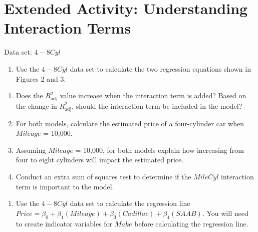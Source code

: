 \documentclass[
]{report}
\providecommand{\tightlist}{%
  \setlength{\itemsep}{0pt}\setlength{\parskip}{0pt}}
\begin{document}
\vspace*{2cm}

\section*{Extended Activity: Understanding Interaction Terms}\label{extended-activity-understanding-interaction-terms}

Data set: \(4-8Cyl\)

\begin{enumerate}
\def\labelenumi{\arabic{enumi}.}
\setcounter{enumi}{34}
\tightlist
\item
  Use the \(4-8Cyl\) data set to calculate the two regression equations shown in Figures 2 and 3.
\end{enumerate}

\begin{enumerate}
\def\labelenumi{\alph{enumi}.}
\tightlist
\item
  Does the \(R^2_{\text{adj}}\) value increase when the interaction term is added? Based on the change in \(R^2_{\text{adj}}\), should the interaction term be included in the model?
\item
  For both models, calculate the estimated price of a four-cylinder car when \(Mileage\) = 10,000.
\item
  Assuming \(Mileage\) = 10,000, for both models explain how increasing from four to eight cylinders will impact the estimated price.
\item
  Conduct an extra sum of squares test to determine if the \(MileCyl\) interaction term is important to the model.
\end{enumerate}

\begin{enumerate}
\def\labelenumi{\arabic{enumi}.}
\setcounter{enumi}{35}
\tightlist
\item
  Use the \(4-8Cyl\) data set to calculate the regression line \(Price = \beta_0 + \beta_1(Mileage) + \beta_3(Cadillac) + \beta_4(SAAB)\). You will need to create indicator variables for \(Make\) before calculating the regression line.
\end{enumerate}
\end{document}
